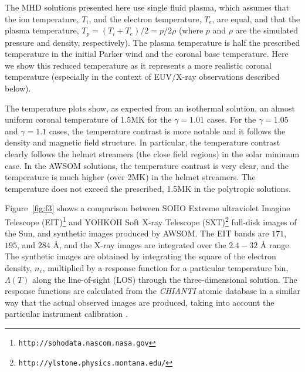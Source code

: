 \documentclass[apj]{emulateapj}
\begin{document}
The MHD solutions presented here use single fluid plasma, which assumes that the ion temperature, $T_i$, and the electron temperature, $T_e$, are equal, and that the plasma temperature, $T_p=(T_i+T_e)/2=p/2\rho$ (where $p$ and $\rho$ are the simulated pressure and density, respectively). The plasma temperature is half the prescribed temperature in the initial Parker wind and the coronal base temperature. Here we show this reduced temperature as it represents a more realistic coronal temperature (especially in the context of EUV/X-ray observations described below).

The temperature plots show, as expected from an isothermal solution, an almost uniform coronal temperature of 1.5MK for the $\gamma=1.01$ cases. For the $\gamma=1.05$ and $\gamma=1.1$ cases, the temperature contrast is more notable and it follows the density and magnetic field structure. In particular, the temperature contrast clearly follows the helmet streamers (the close field regions) in the solar minimum case. In the AWSOM solutions, the temperature contrast is very clear, and the temperature is much higher (over 2MK) in the helmet streamers. The temperature does not exceed the prescribed, 1.5MK in the polytropic solutions. 

Figure~\ref{fig:f3} shows a comparison between SOHO Extreme ultraviolet Imagine Telescope (EIT)\footnote
{{\tt http://sohodata.nascom.nasa.gov}} and YOHKOH Soft X-ray Telescope (SXT)\footnote
{{\tt http://ylstone.physics.montana.edu/}} full-disk images of the Sun, and synthetic images produced by AWSOM. The EIT bands are $171$, $195$, and $284$ {\AA}, and the X-ray images are integrated over the $2.4-32$ {\AA} range. The synthetic images are obtained by integrating the square of the electron density, $n_e$, multiplied by a response function for a particular temperature bin, $\Lambda(T)$ along the line-of-sight (LOS) through the three-dimensional solution. The response functions are calculated from the {\it CHIANTI} atomic database \citep[see e.g.,][]{Dare97,Landi13} in a similar way that the actual observed images are produced, taking into account the particular instrument calibration \citep[see][for more details about the production of synthetic LOS images in {\it BATS-R-US}]{Downs10,Oran15}. 
\end{document}
